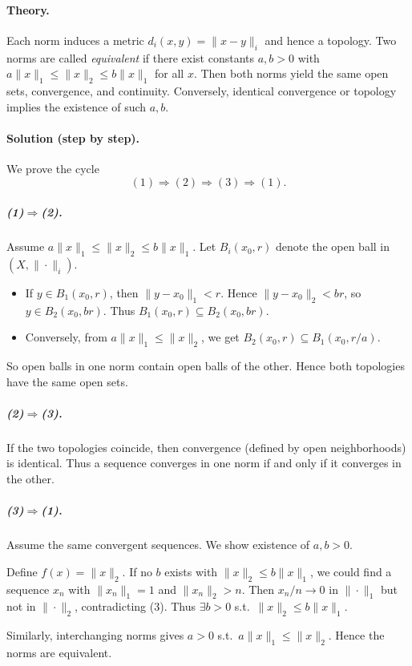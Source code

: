 \documentclass[12pt,a4paper]{article}
\theoremstyle{plain}
\theoremstyle{definition}
\theoremstyle{remark}
\theoremstyle{remark}
\begin{document}
\paragraph{Theory.}
Each norm induces a metric $d_i(x,y)=\|x-y\|_i$ and hence a topology.
Two norms are called \emph{equivalent} if there exist constants $a,b>0$
with $a\|x\|_1\le\|x\|_2\le b\|x\|_1$ for all $x$.
Then both norms yield the same open sets, convergence, and continuity.
Conversely, identical convergence or topology implies the existence of such $a,b$.



\paragraph{Solution (step by step).}
We prove the cycle
\[
(1)\Rightarrow(2)\Rightarrow(3)\Rightarrow(1).
\]

\subparagraph{(1)$\Rightarrow$(2).}
Assume $a\|x\|_1 \le \|x\|_2 \le b\|x\|_1$.
Let $B_i(x_0,r)$ denote the open ball in $(X,\|\cdot\|_i)$.
\begin{itemize}
	\item If $y\in B_1(x_0,r)$, then $\|y-x_0\|_1 < r$.  
	Hence $\|y-x_0\|_2 < br$, so $y\in B_2(x_0,br)$.  
	Thus $B_1(x_0,r)\subseteq B_2(x_0,br)$.
	\item Conversely, from $a\|x\|_1\le\|x\|_2$, we get  
	$B_2(x_0,r)\subseteq B_1(x_0,r/a)$.
\end{itemize}
So open balls in one norm contain open balls of the other.
Hence both topologies have the same open sets.

\subparagraph{(2)$\Rightarrow$(3).}
If the two topologies coincide, then convergence (defined by open neighborhoods)
is identical. Thus a sequence converges in one norm if and only if it converges in the other.

\subparagraph{(3)$\Rightarrow$(1).}
Assume the same convergent sequences.  
We show existence of $a,b>0$.

Define $f(x)=\|x\|_2$.
If no $b$ exists with $\|x\|_2\le b\|x\|_1$,  
we could find a sequence $x_n$ with $\|x_n\|_1=1$ and $\|x_n\|_2>n$.  
Then $x_n/n\to 0$ in $\|\cdot\|_1$ but not in $\|\cdot\|_2$, contradicting (3).  
Thus $\exists b>0$ s.t.\ $\|x\|_2\le b\|x\|_1$.

Similarly, interchanging norms gives $a>0$ s.t.\ $a\|x\|_1\le\|x\|_2$.  
Hence the norms are equivalent.
\end{document}
